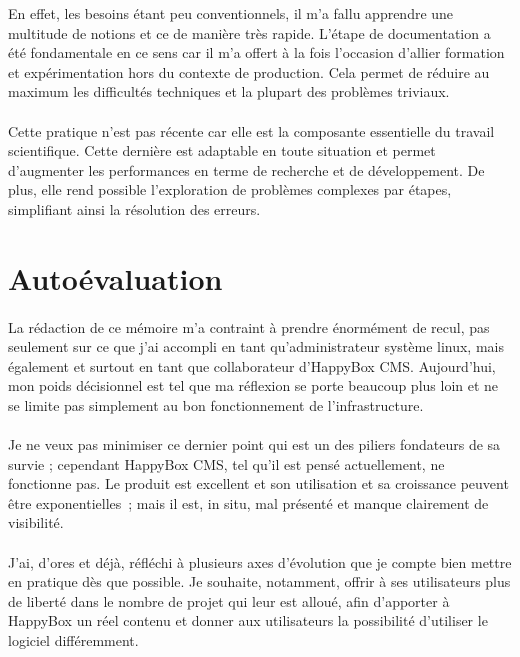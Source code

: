 \documentclass[11pt, a4paper ]{article}
\let\stdsection\section
\renewcommand\section{\newpage\stdsection}
\begin{document}
\begin{spacing}{1.5}
En effet, les besoins étant peu conventionnels, il m'a fallu apprendre une multitude de notions et ce de manière très rapide. L'étape de documentation a été fondamentale en ce sens car il m'a offert à la fois l'occasion d'allier formation et expérimentation hors du contexte de production. Cela permet de  réduire au maximum les difficultés techniques et la plupart des problèmes triviaux.

\paragraph{}
Cette pratique n'est pas récente car elle est la composante essentielle du travail scientifique. Cette dernière est adaptable en toute situation et permet d’augmenter les performances en terme de recherche et de développement. De plus, elle rend possible l'exploration de problèmes complexes par étapes, simplifiant ainsi la résolution des erreurs.



	\section{Autoévaluation} %
\paragraph{}
La rédaction de ce mémoire m'a contraint à prendre énormément de recul, pas seulement sur ce que j'ai accompli en tant qu'administrateur système linux, mais également et surtout en tant que collaborateur d'HappyBox CMS. Aujourd'hui, mon poids décisionnel est tel que ma réflexion se porte beaucoup plus loin et ne se limite pas simplement au bon fonctionnement de l'infrastructure.
\paragraph{}
Je ne veux pas minimiser ce dernier point qui est un des piliers fondateurs de sa survie ; cependant HappyBox CMS, tel qu'il est pensé actuellement, ne fonctionne pas. Le produit est excellent et son utilisation et sa croissance peuvent être exponentielles ; mais il est, in situ, mal présenté et manque clairement de visibilité.

\paragraph{}
J'ai, d'ores et déjà, réfléchi à plusieurs axes d'évolution que je compte bien mettre en pratique dès que possible. Je souhaite, notamment, offrir à ses utilisateurs plus de liberté dans le nombre de projet qui leur est alloué, afin d'apporter à HappyBox un réel contenu et donner aux utilisateurs la possibilité d'utiliser le logiciel différemment.

\end{spacing}
\end{document}
